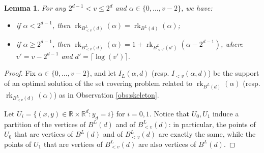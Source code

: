 \documentclass[11pt,a4paper]{article}
\newtheorem{lemma}[theorem]{Lemma}
\newcommand{\R}{\mathbb{R}}
\newcommand{\1}{\textbf{1}}
\newcommand{\rk}{\operatorname{rk}}
\newcommand{\sk}{\operatorname{sk}}
\newcommand\manuel[1]{\textcolor{LimeGreen}{\textbf{ MA:  #1}}}
\begin{document}
\begin{lemma}\label{lem:trunc}
For any $2^{d-1}< v\leq 2^d$ and $\alpha\in \{0,\dots,v-2\}$, we have:
\begin{itemize}
    \item if $\alpha< 2^{d-1}$, then $\rk_{B^L_{< v}(d)}(\alpha)=\rk_{B^L(d)}(\alpha)$;
    \item if $\alpha\geq 2^{d-1}$, then $\rk_{B^L_{< v}(d)}(\alpha)=1+\rk_{B^L_{< v'}(d')}(\alpha-2^{d-1})$, where $v'=v-2^{d-1}$ and $d'=\lceil{\log(v')}\rceil$.
\end{itemize}
\end{lemma}
\begin{proof}
Fix $\alpha \in \{0,\dots,v-2\}$, and let $I_L(\alpha,d)$ (resp. $I_{<v}(\alpha,d)$) be the support of an optimal solution of the set covering problem related to $\rk_{B^L(d)}(\alpha)$ (resp. $\rk_{B^L_{< v}(d)}(\alpha)$) as in Observation \ref{obs:skeleton}. 

Let $U_i=\{(x,y)\in \R\times \R^d: y_d=i\}$ for $i=0,1$.
Notice that $U_0, U_1$ induce a partition of the vertices of $B^L(d)$ and of $B^L_{<v}(d)$: in particular, the points of $U_0$ that are vertices of $B^L(d)$ and of $B^L_{<v}(d)$ are exactly the same, while the points of $U_1$ that are vertices of $B^L_{<v}(d)$ are also vertices of $B^L(d)$. 


\end{proof}
\end{document}
